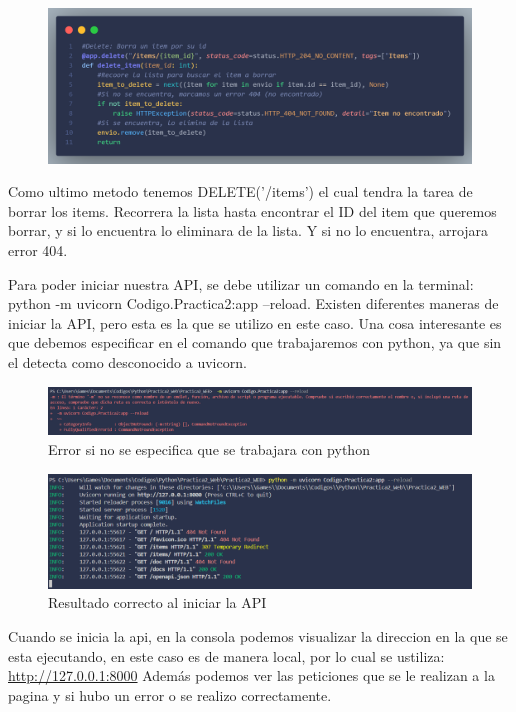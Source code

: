 \documentclass[12pt]{article}
\begin{document}
\begin{figure}[H]
    \centering
    \includegraphics[width=1\textwidth]{Imagenes/Captura10_patch.png}    
\end{figure}
Como ultimo metodo tenemos DELETE('/items') el cual tendra la tarea de borrar los items.
Recorrera la lista hasta encontrar el ID del item que queremos borrar, y si lo encuentra lo eliminara de la lista.
Y si no lo encuentra, arrojara error 404.

\vspace{1cm}

Para poder iniciar nuestra API, se debe utilizar un comando en la terminal: python -m uvicorn Codigo.Practica2:app --reload.
Existen diferentes maneras de iniciar la API, pero esta es la que se utilizo en este caso.
Una cosa interesante es que debemos especificar en el comando que trabajaremos con python, ya que sin el detecta como desconocido a uvicorn.
\begin{figure}[H]
    \centering
    \includegraphics[width=1\textwidth]{Imagenes/Captura_consola2.png}
    \caption{Error si no se especifica que se trabajara con python}
\end{figure}

\begin{figure}[H]
    \centering
    \includegraphics[width=1\textwidth]{Imagenes/Captura_consola1.png}
    \caption{Resultado correcto al iniciar la API}
\end{figure}
Cuando se inicia la api, en la consola podemos visualizar la direccion en la que se esta ejecutando, en este caso es de manera local, por lo cual se ustiliza: \url{http://127.0.0.1:8000}
Además podemos ver las peticiones que se le realizan a la pagina y si hubo un error o se realizo correctamente.
\end{document}
